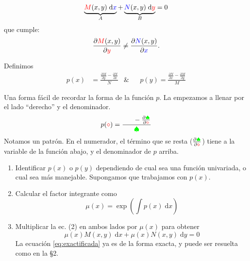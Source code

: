 \documentclass[a4paper]{article}
\newcommand{\dif}[1]{\;\mathrm{d}#1}
\begin{document}
\begin{equation}
    \label{eq:forma-exacta-2}
    \underbrace{{\color{red}M}(x,y) \dif{{\color{blue}x}}}_{A} + \underbrace{{\color{blue}N}(x,y) \dif{{\color{red} y}}}_{B} = 0
\end{equation}
que cumple:
\begin{equation*}
    \frac{\partial {\color{red}M}(x,y)}{\partial {\color{red}y }} \neq \frac{\partial {\color{blue} N}(x,y)}{\partial {\color{blue} x}}.
\end{equation*}

Definimos
\begin{align*}
    p(x) &= \frac{\frac{\partial M}{\partial y} - \frac{\partial N}{\partial x}}{N} &\text{\&} && p(y) = \frac{\frac{\partial N}{\partial x} - \frac{\partial M}{\partial y}}{M}
\end{align*}

\begin{obs}
    Una forma fácil de recordar la forma de la función $p$.
    La empezamos a llenar por el lado ``derecho'' y el denominador.
    \begin{equation*}
        p({\color{red} \diamond}) = \frac{\phantom{\frac{\partial M}{\partial x}} - \frac{\partial {\color{green} \spadesuit}}{\partial{\color{red} \diamond}}}{{\color{green} \spadesuit}}
    \end{equation*}
    Notamos un patrón. En el numerador, el término que se resta ($\frac{\partial {\color{green} \spadesuit}}{\partial {\color{red} \diamond} }$) tiene a la variable de la función abajo, y el denominador de $p$ arriba.
\end{obs}

\begin{enumerate}
    \item Identificar $p(x)$ o $p(y)$ dependiendo de cual sea una función univariada, o cual sea más manejable.
    Supongamos que trabajamos con $p(x)$.

    \item Calcular el factor integrante como
    \begin{equation*}
        \mu(x) = \exp \left( \int p(x) \dif{x} \right)
    \end{equation*}

    \item Multiplicar la ec. (2) en ambos lados por $\mu(x)$ para obtener
    \begin{equation}
        \label{eq:exactificada}
        \mu(x) M(x,y) \dif{x} + \mu(x) N(x,y) \dif{y} = 0
    \end{equation}
    La ecuación \ref{eq:exactificada} ya es de la forma exacta, y puede ser resuelta como en la \S 2.
\end{enumerate}
\end{document}

